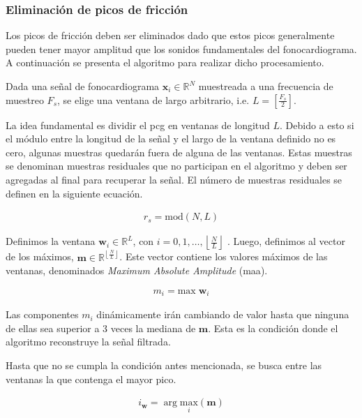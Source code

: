 \pagebreak

\subsubsection*{Eliminación de picos de fricción}

\indent Los picos de fricción deben ser eliminados dado que estos picos generalmente pueden tener mayor amplitud que
los sonidos fundamentales del fonocardiograma. A continuación se presenta el algoritmo para realizar dicho
procesamiento. \bigskip

\indent Dada una señal de fonocardiograma $\bm{x}_i \in \mathbb{R}^N$ muestreada a una frecuencia de muestreo $F_s$,
se elige una ventana de largo arbitrario, i.e. $L = \left[\frac{F_s}{2}\right]$. \bigskip

\indent La idea fundamental es dividir el \gls{pcg} en ventanas de longitud $L$. Debido a esto si el módulo
entre la longitud de la señal y el largo de la ventana definido no es cero, algunas muestras quedarán fuera de
alguna de las ventanas. Estas muestras se denominan muestras residuales que no participan en el algoritmo y deben
ser agregadas al final para recuperar la señal. El número de muestras residuales se definen en la siguiente ecuación.

\begin{align}
  r_s = \mathrm{mod}(N,L)
\end{align}

\indent Definimos la ventana $\bm{w}_i \in \mathbb{R}^L$, con $i = 0,1,\dots,\left\lfloor \frac{N}{L} \right\rfloor$
. Luego, definimos al vector de los máximos, $\bm{m} \in \mathbb{R}^{\left\lfloor \frac{N}{L} \right\rfloor}$. Este
vector contiene los valores máximos de las ventanas, denominados \textit{Maximum Absolute Amplitude} (\gls{maa}).

\begin{align}
  m_i = \mathrm{max} \; \bm{w}_i
\end{align}

\indent Las componentes $m_i$ dinámicamente irán cambiando de valor hasta que ninguna de ellas sea superior a 3
veces la mediana de $\bm{m}$. Esta es la condición donde el algoritmo reconstruye la señal filtrada. \bigskip

\indent Hasta que no se cumpla la condición antes mencionada, se busca entre las ventanas la que contenga el mayor
pico.

\begin{align}
  i_{\bm{w}} = \arg \underset{i}{\mathrm{max}} (\bm{m})
\end{align}

